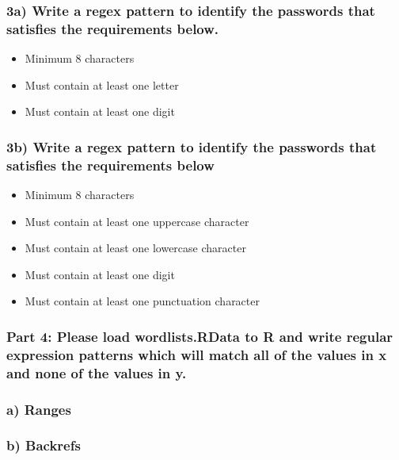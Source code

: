 \documentclass[
]{article}
\providecommand{\tightlist}{%
  \setlength{\itemsep}{0pt}\setlength{\parskip}{0pt}}
\begin{document}
\subsubsection{3a) Write a regex pattern to identify the passwords that
satisfies the requirements
below.}\label{a-write-a-regex-pattern-to-identify-the-passwords-that-satisfies-the-requirements-below.}

\begin{itemize}
\tightlist
\item
  Minimum 8 characters
\item
  Must contain at least one letter
\item
  Must contain at least one digit
\end{itemize}

\subsubsection{3b) Write a regex pattern to identify the passwords that
satisfies the requirements
below}\label{b-write-a-regex-pattern-to-identify-the-passwords-that-satisfies-the-requirements-below}

\begin{itemize}
\tightlist
\item
  Minimum 8 characters
\item
  Must contain at least one uppercase character
\item
  Must contain at least one lowercase character
\item
  Must contain at least one digit
\item
  Must contain at least one punctuation character
\end{itemize}

\subsubsection{Part 4: Please load wordlists.RData to R and write
regular expression patterns which will match all of the values in x and
none of the values in
y.}\label{part-4-please-load-wordlists.rdata-to-r-and-write-regular-expression-patterns-which-will-match-all-of-the-values-in-x-and-none-of-the-values-in-y.}

\subsubsection{a) Ranges}\label{a-ranges}

\subsubsection{b) Backrefs}\label{b-backrefs}
\end{document}
